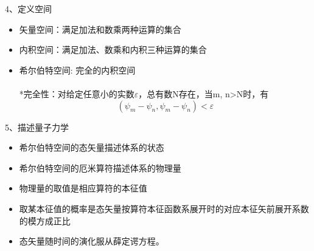 \begin{frame}
    4、定义空间\\
   \begin{itemize}
       \item 矢量空间：满足加法和数乘两种运算的集合
       \item 内积空间：满足加法、数乘和内积三种运算的集合
       \item 希尔伯特空间:  完全的内积空间\\
       ~~ \\
       *完全性：对给定任意小的实数$\varepsilon$，总有数N存在，当m, n>N时，有\\
       $$ (\psi_m -\psi_n, \psi_m -\psi_n )< \varepsilon $$
   \end{itemize} 
\end{frame} 

\begin{frame}
   5、描述量子力学\\
   \begin{itemize}
       \item 希尔伯特空间的态矢量描述体系的状态
       \item 希尔伯特空间的厄米算符描述体系的物理量
       \item 物理量的取值是相应算符的本征值
       \item 取某本征值的概率是态矢量按算符本征函数系展开时的对应本征矢前展开系数的模方成正比
       \item 态矢量随时间的演化服从薛定谔方程。
   \end{itemize}
\end{frame} 


